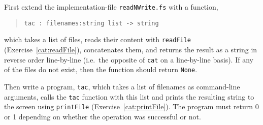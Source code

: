 First extend the implementation-file \lstinline{readNWrite.fs} with a function,
\begin{quote}
  \mbox{\lstinline!tac : filenames:string list -> string!}
\end{quote}
which takes a list of files, reads their content with
\lstinline{readFile} (Exercise~\ref{cat:readFile}), concatenates them,
and returns the result as a string in reverse order line-by-line
(i.e.\ the opposite of \lstinline{cat} on a line-by-line basis).  If any of the
files do not exist, then the function should return \lstinline{None}.

Then write a program, \lstinline[language=console]{tac}, which takes a
list of filenames as command-line arguments, calls the \lstinline{tac}
function with this list and prints the resulting string to the screen
using \lstinline{printFile} (Exercise~\ref{cat:printFile}). The
program must return 0 or 1 depending on whether the operation was
successful or not.
